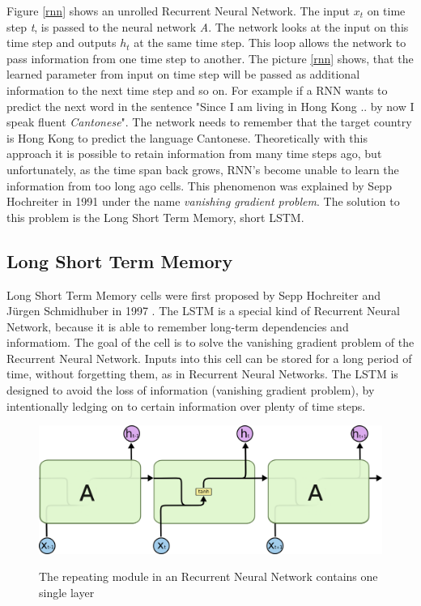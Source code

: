 Figure \ref{rnn} shows an unrolled Recurrent Neural Network. The input \(x_t\) on time step \textit{t}, is passed to the neural network \textit{A}. The network looks at the input on this time step and outputs \(h_t\) at the same time step. This loop allows the network to pass information from one time step to another. The picture \ref{rnn} shows, that the learned parameter from input  on time step  will be passed as additional information to the next time step  and so on. For example if a RNN wants to predict the next word in the sentence "Since I am living in Hong Kong .. by now I speak fluent \textit{Cantonese}". The network needs to remember that the target country is Hong Kong to predict the language Cantonese. Theoretically with this approach it is possible to retain information from many time steps ago, but unfortunately, as the time span back grows, RNN's become unable to learn the information from too long ago cells. This phenomenon was explained by Sepp Hochreiter in 1991 \cite{Hochreiter:91} under the name \textit{vanishing gradient problem}. The solution to this problem is the Long Short Term Memory, short LSTM.

\subsection{Long Short Term Memory}\label{ss:lstm}
Long Short Term Memory cells were first proposed by Sepp Hochreiter and Jürgen Schmidhuber in 1997 \cite{hochreiter1997long}. The LSTM is a special kind of Recurrent Neural Network, because it is able to remember long-term dependencies and informatiom. The goal of the cell is to solve the vanishing gradient problem of the Recurrent Neural Network. Inputs into this cell can be stored for a long period of time, without forgetting them, as in Recurrent Neural Networks. The LSTM is designed to avoid the loss of information (vanishing gradient problem), by intentionally ledging on to certain information over plenty of time steps. 

\begin{figure}
	\begin{center}
		\includegraphics[width=4.5in]{photos/LSTM3-SimpleRNN}\\
		\caption{The repeating module in an Recurrent Neural Network contains one single layer \cite{olah}}\label{lstm}
	\end{center}
\end{figure}

